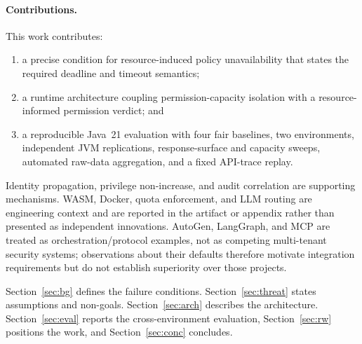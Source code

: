 \paragraph{Contributions.}
This work contributes:

\begin{enumerate}
  \item a precise condition for resource-induced policy unavailability that
  states the required deadline and timeout semantics;
  \item a runtime architecture coupling permission-capacity isolation with a
  resource-informed permission verdict; and
  \item a reproducible Java~21 evaluation with four fair baselines, two
  environments, independent JVM replications, response-surface and capacity
  sweeps, automated raw-data aggregation, and a fixed API-trace replay.
\end{enumerate}

Identity propagation, privilege non-increase, and audit correlation are
supporting mechanisms. WASM, Docker, quota enforcement, and LLM routing are
engineering context and are reported in the artifact or appendix rather than
presented as independent innovations. AutoGen, LangGraph, and MCP are treated
as orchestration/protocol examples, not as competing multi-tenant security
systems; observations about their defaults therefore motivate integration
requirements but do not establish superiority over those projects.

Section~\ref{sec:bg} defines the failure conditions. Section~\ref{sec:threat}
states assumptions and non-goals. Section~\ref{sec:arch} describes the
architecture. Section~\ref{sec:eval} reports the cross-environment
evaluation, Section~\ref{sec:rw} positions the work, and Section~\ref{sec:conc}
concludes.
